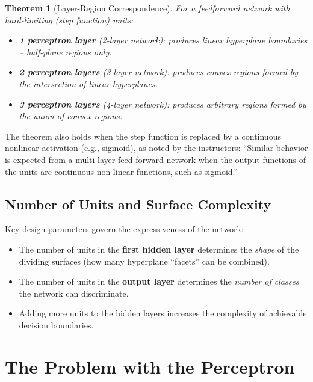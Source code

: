\documentclass[12pt,a4paper]{article}
\newtheorem{theorem}{Theorem}[section]
\begin{document}
\begin{theorem}[Layer-Region Correspondence]
\label{thm:layers-regions}
For a feedforward network with hard-limiting (step function) units:
\begin{itemize}[noitemsep]
  \item \textbf{1 perceptron layer} (2-layer network): produces linear
        hyperplane boundaries -- half-plane regions only.
  \item \textbf{2 perceptron layers} (3-layer network): produces
        convex regions formed by the intersection of linear hyperplanes.
  \item \textbf{3 perceptron layers} (4-layer network): produces
        arbitrary regions formed by the union of convex regions.
\end{itemize}
\end{theorem}

The theorem also holds when the step function is replaced by a continuous
nonlinear activation (e.g., sigmoid), as noted by the instructors:
``Similar behavior is expected from a multi-layer feed-forward network
when the output functions of the units are continuous non-linear
functions, such as sigmoid.''

\subsection{Number of Units and Surface Complexity}
\label{subsec:unit-count}

Key design parameters govern the expressiveness of the network:

\begin{itemize}[noitemsep]
  \item The number of units in the \textbf{first hidden layer} determines
        the \emph{shape} of the dividing surfaces (how many hyperplane
        ``facets'' can be combined).
  \item The number of units in the \textbf{output layer} determines the
        \emph{number of classes} the network can discriminate.
  \item Adding more units to the hidden layers increases the complexity
        of achievable decision boundaries.
\end{itemize}

\section{The Problem with the Perceptron}
\label{sec:problem}
\end{document}
